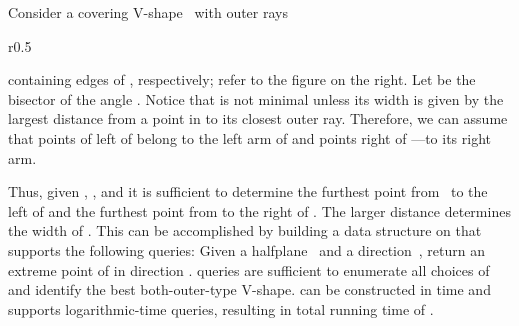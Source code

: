 \documentclass{llncs}
\begin{document}
Consider a covering V-shape~ with outer rays 
\begin{wrapfigure}[8]{r}{0.5 \textwidth}
\end{wrapfigure}
containing edges  of , respectively; refer to the figure
on the right.  Let  be the bisector of the angle . 
Notice that  is not minimal unless its width is given by the
largest distance from a point in  to its closest outer ray.
Therefore, we can assume that points of  left of  belong to the
left arm of  and points right of ---to its right arm.



Thus, given , , and  it is sufficient to determine the
furthest point from~ to the left of  and the furthest point
from  to the right of .  The larger distance determines the
width of .  This can be accomplished by building a data structure
 on  that supports the following queries: Given a
halfplane~ and a direction~, return an extreme point of  in direction .   queries are sufficient to enumerate all
choices of  and identify the best both-outer-type V-shape.
 can be constructed in  time and supports
logarithmic-time queries, resulting in total running time of
.
\end{document}
